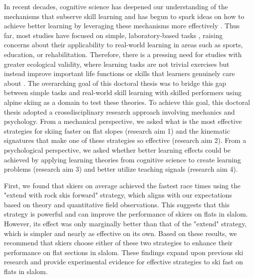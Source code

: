 In recent decades, cognitive science has deepened our understanding of the mechanisms that subserve skill learning and has begun to spark ideas on how to achieve better learning by leveraging these mechanisms more effectively \parencite{wolpert_principles_2011, makino_circuit_2016, spampinato_multiple_2021, krakauer_motor_2019, haith_model-based_2013, huang_rethinking_2011, shmuelof_are_2011, doya_complementary_2000}. Thus far, most studies have focused on simple, laboratory-based tasks \parencite{krakauer_motor_2019, du_relationship_2022, yarrow_inside_2009}, raising concerns about their applicability to real-world learning in areas such as sports, education, or rehabilitation. Therefore, there is a pressing need for studies with greater ecological validity, where learning tasks are not trivial exercises but instead improve important life functions or skills that learners genuinely care about \parencite{spampinato_multiple_2021, du_relationship_2022}. The overarching goal of this doctoral thesis was to bridge this gap between simple tasks and real-world skill learning with skilled performers using alpine skiing as a domain to test these theories. To achieve this goal, this doctoral thesis adopted a crossdisciplinary research approach involving mechanics and psychology. From a mechanical perspective, we asked what is the most effective strategies for skiing faster on flat slopes (research aim 1) and the kinematic signatures that make one of these strategies so effective (research aim 2). From a psychological perspective, we asked whether better learning effects could be achieved by applying learning theories from cognitive science to create learning problems (research aim 3) and better utilize teaching signals (research aim 4).  

First, we found that skiers on average achieved the fastest race times using the "extend with rock skis forward" strategy, which aligns with our expectations based on theory and quantitative field observations. This suggests that this strategy is powerful and can improve the performance of skiers on flats in slalom. However, its effect was only marginally better than that of the "extend" strategy, which is simpler and nearly as effective on its own. Based on these results, we recommend that skiers choose either of these two strategies to enhance their performance on flat sections in slalom. These findings expand upon previous ski research and provide experimental evidence for effective strategies to ski fast on flats in slalom.


